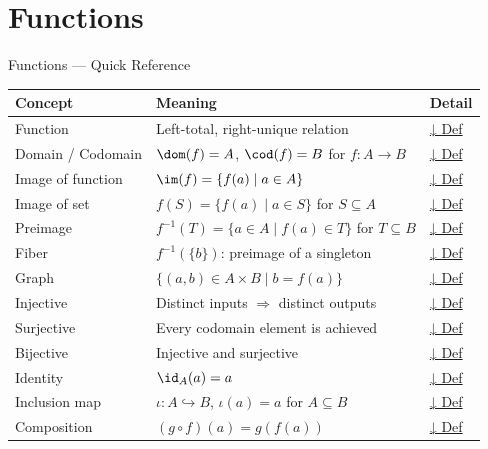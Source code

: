 \section{Functions}


\begin{toolkitbox}{Functions — Quick Reference}
\small
\begin{tabular}{l l l}
\toprule
\textbf{Concept} & \textbf{Meaning} & \textbf{Detail} \\
\midrule
Function         & Left-total, right-unique relation                            & \hyperref[def:function]{↓ Def} \\
Domain / Codomain & $\dom(f) = A$,\; $\cod(f) = B$ for $f : A \to B$            & \hyperref[def:domain-codomain]{↓ Def} \\
Image of function & $\im(f) = \{f(a) \mid a \in A\}$                            & \hyperref[def:image-function]{↓ Def} \\
Image of set      & $f(S) = \{f(a) \mid a \in S\}$ for $S \subseteq A$          & \hyperref[def:image-set]{↓ Def} \\
Preimage          & $f^{-1}(T) = \{a \in A \mid f(a) \in T\}$ for $T \subseteq B$ & \hyperref[def:preimage]{↓ Def} \\
Fiber             & $f^{-1}(\{b\})$: preimage of a singleton                    & \hyperref[def:fiber]{↓ Def} \\
Graph             & $\{(a,b) \in A\times B \mid b = f(a)\}$                     & \hyperref[def:graph]{↓ Def} \\
Injective         & Distinct inputs $\Rightarrow$ distinct outputs               & \hyperref[def:injective]{↓ Def} \\
Surjective        & Every codomain element is achieved                          & \hyperref[def:surjective]{↓ Def} \\
Bijective         & Injective and surjective                                    & \hyperref[def:bijective]{↓ Def} \\
Identity          & $\id_A(a) = a$                                              & \hyperref[def:identity]{↓ Def} \\
Inclusion map     & $\iota : A \hookrightarrow B$, $\iota(a) = a$ for $A \subseteq B$ & \hyperref[def:inclusion]{↓ Def} \\
Composition       & $(g \circ f)(a) = g(f(a))$                                  & \hyperref[def:composition]{↓ Def} \\

\end{tabular}
\end{toolkitbox}
